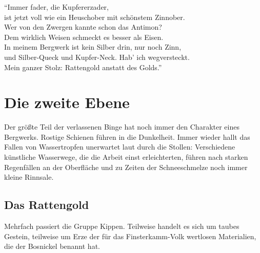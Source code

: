 \documentclass[openright]{Ilaris}
\newcommand{\fkv}{Finsterkamm-Volk }
\begin{document}

\enquote{Immer fader, die Kupfererzader,\\
ist jetzt voll wie ein Heuschober mit schönstem Zinnober.\\
Wer von den Zwergen kannte schon das Antimon?\\
Dem wirklich Weisen schmeckt es besser als Eisen.\\
In meinem Bergwerk ist kein Silber drin, nur noch Zinn,\\
und Silber-Queck und Kupfer-Neck. Hab' ich wegversteckt.\\
Mein ganzer Stolz: Rattengold anstatt des Golds.}





\section{Die zweite Ebene}
Der größte Teil der verlassenen Binge hat noch immer den Charakter eines Bergwerks.
Rostige Schienen führen in die Dunkelheit.
Immer wieder hallt das Fallen von Wassertropfen unerwartet laut durch die Stollen:
Verschiedene künstliche Wasserwege, die die Arbeit einst erleichterten, führen nach starken Regenfällen an der Oberfläche und zu Zeiten der Schneeschmelze noch immer kleine Rinnsale.

\subsection{Das Rattengold}
Mehrfach passiert die Gruppe Kippen. Teilweise handelt es sich um taubes Gestein, teilweise um Erze der für das \fkv wertlosen Materialien, die der Bosnickel benannt hat.
\end{document}
